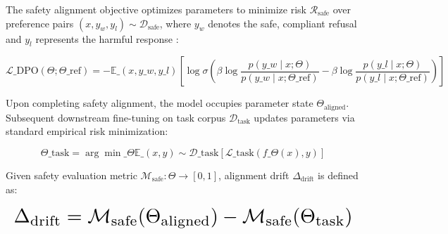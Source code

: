 \documentclass[10pt,journal,compsoc,twocolumn]{IEEEtran}
\begin{document}
The safety alignment objective optimizes parameters to minimize risk $\mathcal{R}_{\text{safe}}$ over preference pairs $(x, y_w, y_l) \sim \mathcal{D}_{\text{safe}}$, where $y_w$ denotes the safe, compliant refusal and $y_l$ represents the harmful response \cite{arxiv_2305_18290}:

\begin{equation}
\label{eq:dpo\_loss}
\mathcal{L}\_{\text{DPO}}(\Theta; \Theta\_{\text{ref}}) = -\mathbb{E}\_{(x, y\_w, y\_l)}\left[ \log \sigma \left( \beta \log \frac{p(y\_w \mid x; \Theta)}{p(y\_w \mid x; \Theta\_{\text{ref}})} - \beta \log \frac{p(y\_l \mid x; \Theta)}{p(y\_l \mid x; \Theta\_{\text{ref}})} \right) \right]
\end{equation}

Upon completing safety alignment, the model occupies parameter state $\Theta_{\text{aligned}}$. Subsequent downstream fine-tuning on task corpus $\mathcal{D}_{\text{task}}$ updates parameters via standard empirical risk minimization:

\begin{equation}
\label{eq:downstream\_erm}
\Theta\_{\text{task}} = \arg\min\_\Theta \mathbb{E}\_{(x, y) \sim \mathcal{D}\_{\text{task}}} \left[ \mathcal{L}\_{\text{task}}(f\_\Theta(x), y) \right]
\end{equation}

Given safety evaluation metric $\mathcal{M}_{\text{safe}}: \Theta \to [0, 1]$, alignment drift $\Delta_{\text{drift}}$ is defined as:




















\begin{equation}
\resizebox{\columnwidth}{!}{$\displaystyle
\begin{aligned}
\Delta_{\text{drift}} = \mathcal{M}_{\text{safe}}(\Theta_{\text{aligned}}) - \mathcal{M}_{\text{safe}}(\Theta_{\text{task}})
\end{aligned}
$}
\end{equation}
\end{document}
